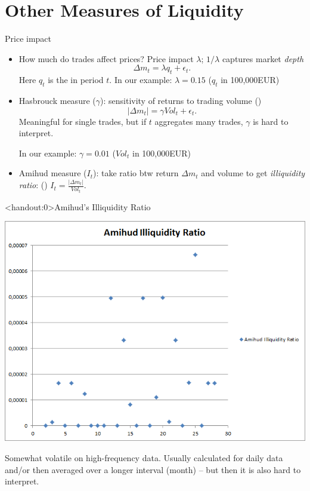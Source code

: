 \documentclass[english,10pt
,aspectratio=169
]{beamer}
\begin{document}
\section{Other Measures of Liquidity}


\begin{frame}{Price impact}
\begin{itemize}
	\item How much do trades affect prices? \alert{Price impact} $\lambda$;  $1/\lambda$ captures market \textit{depth}
	\[
	\Delta m_t = \lambda q_t + \epsilon_t.
	\]
	Here $q_t$ is the  in period $t$. 	
	In our example: $\lambda = 0.15 $ ($q_t$ in 100,000EUR)
	
	\pause
	\item \alert{Hasbrouck measure} ($\gamma$): sensitivity of returns to trading volume (\citet{hasbrouck_empirical_2007})
	\[
	|\Delta m_t | = \gamma Vol_t + \epsilon_t.
	\]
	Meaningful for single trades, but if $t$ aggregates many trades, $\gamma$ is hard to interpret.
	
	In our example: $\gamma = 0.01$ ($Vol_t$ in 100,000EUR)
	
	\pause
	\item \alert{Amihud measure} ($I_t$): take ratio btw return $\Delta m_t$ and volume to get \textit{illiquidity ratio}: (\citet{amihud_illiquidity_2002})
	\center
	$I_t = \frac{|\Delta m_t|}{Vol_t}$.
\end{itemize}
\end{frame}


\begin{frame}<handout:0>{Amihud's Illiquidity Ratio}
	\begin{center}
		\includegraphics[scale=0.39]{pics/L2_Amihud}
	\end{center}
	Somewhat volatile on high-frequency data. Usually calculated for daily data and/or then averaged over a longer interval (month) -- but then it is also hard to interpret.
\end{frame}
\end{document}
